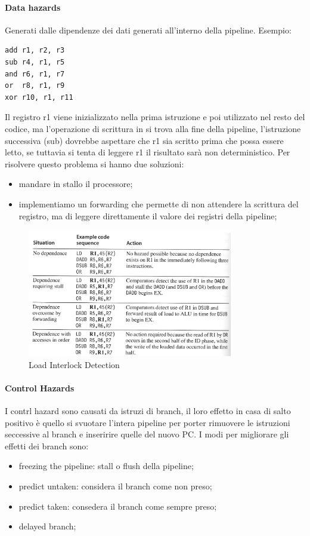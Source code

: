 \documentclass[12pt]{article}
\begin{document}
\paragraph{Data hazards}
Generati dalle dipendenze dei dati generati all'interno della pipeline. Esempio:
\begin{lstlisting}
add r1, r2, r3
sub r4, r1, r5
and r6, r1, r7
or  r8, r1, r9
xor r10, r1, r11
\end{lstlisting}
Il registro r1 viene inizializzato nella prima istruzione e poi utilizzato nel resto del codice, ma l'operazione di scrittura in si trova alla fine della pipeline, l'istruzione successiva (sub) dovrebbe aspettare che r1 sia scritto prima che possa essere letto, se tuttavia si tenta di leggere r1 il risultato sar\`a non deterministico. Per risolvere questo problema si hanno due soluzioni:
\begin{itemize}
    \item mandare in stallo il processore;
    \item implementiamo un forwarding che permette di non attendere la scrittura del registro, ma di leggere direttamente il valore dei registri della pipeline;
\end{itemize}
\begin{figure}[H]
    \centering
    \includegraphics[width=0.8\textwidth]{load-interlock-detection.png}
    \caption{Load Interlock Detection}
    \label{fig:load-interlock-detection}
\end{figure}

\paragraph{Control Hazards}
I contrl hazard sono causati da istruzi di branch, il loro effetto in casa di salto positivo \`e quello si svuotare l'intera pipeline per porter rimuovere le istruzioni seccessive al branch e inseririre quelle del nuovo PC. I modi per migliorare gli effetti dei branch sono:
\begin{itemize}
    \item freezing the pipeline: stall o flush della pipeline;
    \item predict untaken: considera il branch come non preso;
    \item predict taken: consedera il branch come sempre preso;
    \item delayed branch;
\end{itemize}
\end{document}
